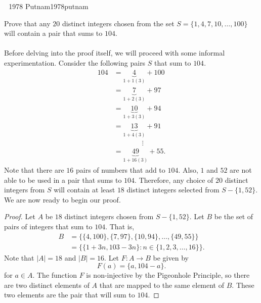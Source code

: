     \begin{example}{\Difficulty\,\Difficulty\,\Difficulty\,\,1978 Putnam}{1978putnam}
        
        Prove that any \(20\) distinct integers chosen from the set \(S=\{1,4,7,10,\ldots,100\}\) will contain a pair that sums to \(104\).
        \\
        \\
        Before delving into the proof itself, we will proceed with some informal experimentation. Consider the following pairs \(S\) that sum to \(104\).
        \begin{align*}
            104&=\underbrace{4}_{1+1(3)}+100 \\
            &=\underbrace{7}_{1+2(3)}+97 \\
            &=\underbrace{10}_{1+3(3)}+94 \\
            &=\underbrace{13}_{1+4(3)}+91 \\
            &\qquad\qquad\vdots \\
            &=\underbrace{49}_{1+16(3)}+55.
        \end{align*}
        Note that there are \(16\) pairs of numbers that add to \(104\). Also, \(1\) and \(52\) are not able to be used in a pair that sums to \(104\). Therefore, any choice of \(20\) distinct integers from \(S\) will contain at least \(18\) distinct integers selected from \(S-\{1,52\}\). We are now ready to begin our proof.
        \begin{proof}
            Let \(A\) be \(18\) distinct integers chosen from \(S-\{1,52\}\). Let \(B\) be the set of pairs of integers that sum to \(104\). That is,
            \begin{align*}
                B&=\{\{4,100\},\{7,97\},\{10,94\},\ldots,\{49,55\}\} \\
                &=\{\{1+3n, 103-3n\}:n\in\{1,2,3,\ldots,16\}\}.
            \end{align*}
            Note that \(|A|=18\) and \(|B|=16\). Let \(F:A\to B\) be given by 
            \begin{equation*}
                F(a)=\{a,104-a\}.
            \end{equation*}
            for \(a\in A\). The function \(F\) is non-injective by the Pigeonhole Principle, so there are two distinct elements of \(A\) that are mapped to the same element of \(B\). These two elements are the pair that will sum to \(104\).
        \end{proof}
    
    \end{example}

